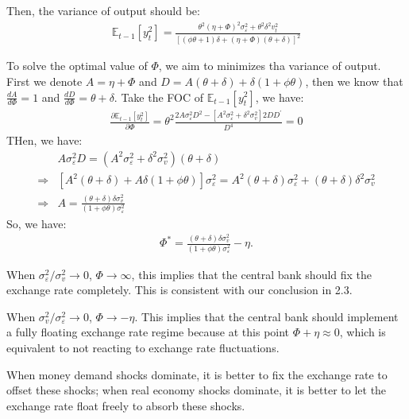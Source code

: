 \documentclass[a4paper,12pt]{article} %
\theoremstyle{nonitalic}
\begin{document}
Then, the variance of output should be:
\begin{gather*}
    \mathbb{E}_{t-1} [y_t^2] = \frac{\theta^2 (\eta + \Phi)^2 \sigma_{\varepsilon}^2 + \theta^2 \delta^2 v_t^2}{\left[ (\phi \theta + 1)\delta + (\eta + \Phi) (\theta + \delta) \right]^2}
\end{gather*}

To solve the optimal value of $\Phi$, we aim to minimizes tha variance of output.
First we denote $A = \eta + \Phi$ and $D = A(\theta +\delta) + \delta (1 + \phi \theta)$,
then we know that $\frac{d A}{d \Phi} = 1$ and $\frac{d D}{d \Phi} = \theta + \delta$.
Take the FOC of $\mathbb{E}_{t-1}[y_t^2]$, we have:
\begin{gather*}
    \frac{\partial \mathbb{E}_{t-1}[y_t^2]}{\partial \Phi} = \theta^2 \frac{2A \sigma_{\varepsilon}^2 D^2 - \left[A^2 \sigma_{\varepsilon}^2 + \delta^2 \sigma_v^2\right] 2D D^{\prime}}{D^4}  = 0
\end{gather*}
THen, we have:
\begin{align*}
    & A \sigma_{\varepsilon}^2 D = \left( A^2 \sigma_{\varepsilon}^2 + \delta^2 \sigma_v^2 \right)(\theta + \delta) \\
    \Rightarrow & \left[ A^2(\theta + \delta) + A \delta (1 + \phi \theta) \right] \sigma_{\varepsilon}^2 = A^2 (\theta + \delta) \sigma_{\varepsilon}^2 + (\theta + \delta) \delta ^2 \sigma _v^2 \\
    \Rightarrow & A = \frac{(\theta + \delta) \delta \sigma_v^2}{(1 + \phi \theta) \sigma_{\varepsilon}^2}
\end{align*}
So, we have:
\begin{gather*}
    \Phi^* = \frac{(\theta + \delta) \delta \sigma_v^2}{(1 + \phi \theta) \sigma_{\varepsilon}^2} - \eta.
\end{gather*}

When $\sigma_\varepsilon^2/\sigma_v^2 \to 0$, $\Phi \to \infty$, 
this implies that the central bank should fix the exchange rate completely. 
This is consistent with our conclusion in 2.3.

When $\sigma_v^2/\sigma_\varepsilon^2 \to 0$, $\Phi \to -\eta$. 
This implies that the central bank should implement a fully floating exchange rate regime 
because at this point $\Phi + \eta \approx 0$, which is equivalent to not reacting to exchange rate fluctuations.

When money demand shocks dominate, 
it is better to fix the exchange rate to offset these shocks; 
when real economy shocks dominate, it is better to let the exchange rate float freely to absorb these shocks.
\end{document}
